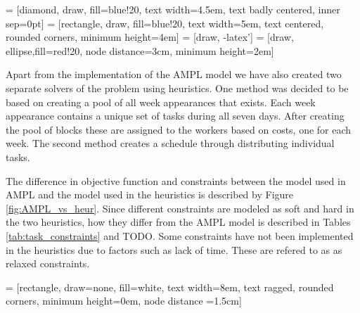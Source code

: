  = [diamond, draw, fill=blue!20, 
    text width=4.5em, text badly centered, inner sep=0pt]
 = [rectangle, draw, fill=blue!20, 
    text width=5em, text centered, rounded corners, minimum height=4em]
 = [draw, -latex']
 = [draw, ellipse,fill=red!20, node distance=3cm,
    minimum height=2em]


Apart from the implementation of the AMPL model we have also created two separate solvers of the problem using heuristics. One method was decided to be based on creating a pool of all week appearances that exists. Each week appearance contains a unique set of tasks during all seven days. After creating the pool of blocks these are assigned to the workers based on costs, one for each week. The second method creates a schedule through distributing individual tasks.

The difference in objective function and constraints between the model used in AMPL and the model used in the heuristics is described by Figure \ref{fig:AMPL_vs_heur}. Since different constraints are modeled as soft and hard in the two heuristics, how they differ from the AMPL model is described in Tables \ref{tab:task_constraints} and TODO. Some constraints have not been implemented in the heuristics due to factors such as lack of time. These are refered to as as relaxed constraints.

 = [rectangle, draw=none, fill=white,
    text width=8em, text ragged, rounded corners, minimum height=0em, node distance =1.5cm]
    
\newcommand*{\h}{\hspace{18pt}}%
\newcommand*{\hh}{\hspace{24pt}}%

